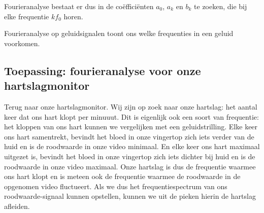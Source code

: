 Fourieranalyse bestaat er dus in de co\"effici\"enten $a_0$, $a_k$ en $b_k$ te zoeken, die bij elke frequentie $k f_0$ horen.


Fourieranalyse op geluidsignalen toont ons welke frequenties in een geluid voorkomen.

\subsection{Toepassing: fourieranalyse voor onze hartslagmonitor}

Terug naar onze hartslagmonitor. Wij zijn op zoek naar onze hartslag: het aantal keer dat ons hart klopt per minuuut. Dit is eigenlijk ook een soort van frequentie: het kloppen van ons hart kunnen we vergelijken met een geluidstrilling. Elke keer ons hart samentrekt, bevindt het bloed in onze vingertop zich iets verder van de huid en is de roodwaarde in onze video minimaal. En elke keer ons hart maximaal uitgezet is, bevindt het bloed in onze vingertop zich iets dichter bij huid en is de roodwaarde in onze video maximaal. Onze hartslag is dus de frequentie waarmee ons hart klopt en is meteen ook de frequentie waarmee de roodwaarde in de opgenomen video fluctueert. Als we dus het frequentiespectrum van ons roodwaarde-signaal kunnen opstellen, kunnen we uit de pieken hierin de hartslag afleiden.

